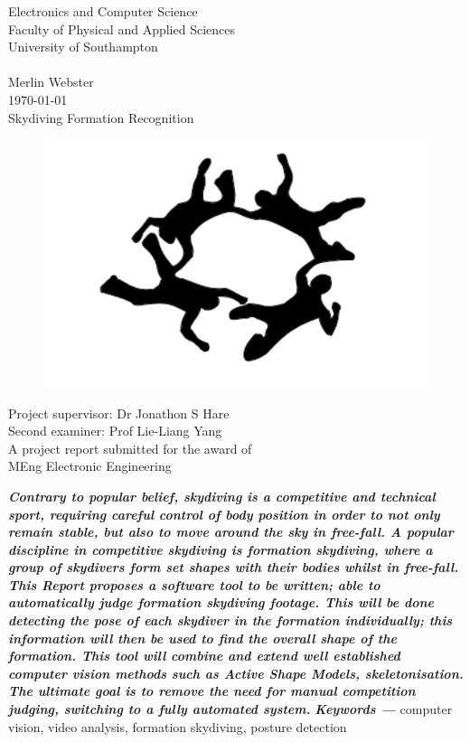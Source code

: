 \documentclass[a4paper, 12pt]{article}
\providecommand{\keywords}[1]{\textbf{\textit{Keywords ---}} #1}
\begin{document}
\begin{titlepage}
\begin{center}{\LARGE
Electronics and Computer Science\\
Faculty of Physical and Applied Sciences\\
University of Southampton\\
\hfill \break
\hfill \break
\hfill \break\\
Merlin Webster\\
\today\\
\hfill \break
Skydiving Formation Recognition\\
\begin{figure}[H]
	\centering
	\includegraphics[width=.7\linewidth]{fs_silhouette.png}
\end{figure}
Project supervisor: Dr Jonathon S Hare\\
Second examiner: Prof Lie-Liang Yang\\
\hfill \break
\hfill \break
A project report submitted for the award of\\
MEng Electronic Engineering\\}
\end{center}
\end{titlepage}
%
\renewenvironment{abstract}
  {\small\quotation
  {\bfseries\noindent{\large\abstractname}\par\nobreak\smallskip}}
  {\endquotation}
%
\thispagestyle{empty}
\setcounter{page}{0}
\begin{abstract}\textbf{\emph{
Contrary to popular belief, skydiving is a competitive and technical sport, requiring careful control of body position in order to not only remain stable, but also to move around the sky in free-fall. A popular discipline in competitive skydiving is formation skydiving, where a group of skydivers form set shapes with their bodies whilst in free-fall. This Report proposes a software tool to be written; able to automatically judge  formation skydiving footage. This will be done detecting the pose of each skydiver in the formation individually; this information will then be used to find the overall shape of the formation. This tool will combine and extend well established computer vision methods such as Active Shape Models, skeletonisation. The ultimate goal is to remove the need for manual competition judging, switching to a fully automated system.
}}\end{abstract}
\keywords{computer vision, video analysis, formation skydiving, posture detection}
\clearpage
\end{document}
